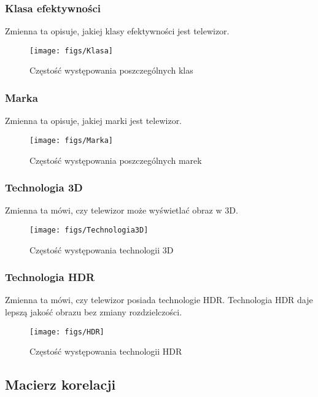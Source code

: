 \documentclass[11pt,a4paper]{article}
\begin{document}
		\subsubsection{Klasa efektywności}
			Zmienna ta opisuje, jakiej klasy efektywności jest telewizor.
			\begin{figure}[!htbp]
				\centering
				\texttt{[image: figs/Klasa]}
				\caption[Klasa]{Częstość występowania poszczególnych klas}
				\label{fig:Klasa}
			\end{figure}
			\FloatBarrier
			\newpage
		
		\subsubsection{Marka}
			Zmienna ta opisuje, jakiej marki jest telewizor.
			\begin{figure}[!htbp]
				\centering
				\texttt{[image: figs/Marka]}
				\caption[Marka]{Częstość występowania poszczególnych marek}
				\label{fig:Marka}
			\end{figure}
			\FloatBarrier
			\newpage
		\subsubsection{Technologia 3D}
			Zmienna ta mówi, czy telewizor może wyświetlać obraz w 3D.
			\begin{figure}[!htbp]
				\centering
				\texttt{[image: figs/Technologia3D]}
				\caption[D3]{Częstość występowania technologii 3D}
				\label{fig:Technologiia3D}
			\end{figure}
			\FloatBarrier
			\newpage
			
		\subsubsection{Technologia HDR}
			Zmienna ta mówi, czy telewizor posiada technologie HDR. Technologia HDR daje lepszą jakość obrazu bez zmiany rozdzielczości. 
			
			\begin{figure}[!htbp]
				\centering
				\texttt{[image: figs/HDR]}
				\caption[HDR]{Częstość występowania technologii HDR}
				\label{fig:HDR}
			\end{figure}
			\FloatBarrier
			\newpage
			
		
	\subsection{Macierz korelacji}
\end{document}
